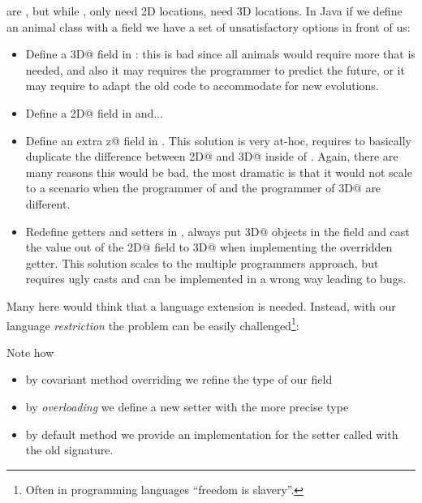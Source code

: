 \Q@Bird@s are \Q@Animal@s, 
but while \Q@Animal@s, only need 2D locations,
\Q@Bird@s need  3D locations.
In Java if we define an animal class with a field we have a set of unsatisfactory options in front of us:
\begin{itemize}
\item Define a \Q@Point3D@ field in \Q@Animal@:
this is bad since all animals would require more that is needed, and also it may requires the programmer to predict the future, or it may require to adapt the old code to accommodate for new evolutions.
\item Define a \Q@Point2D@ field in \Q@Animal@ and...
\item Define an extra \Q@int z@ field in \Q@Bird@.
This solution is very at-hoc, requires to basically duplicate the difference between \Q@Point2D@ and \Q@Point3D@ inside of \mbox{\Q@Bird@}.
Again, there are many reasons this would be bad, the most dramatic is that it would not scale to a scenario when the programmer of \Q@Bird@ and the programmer of \Q@Point3D@ are different.
\item Redefine getters and setters in \Q@Bird@, always put \Q@Point3D@ objects in the field and cast
the value out of the \Q@Point2D@ field to \Q@Point3D@ when implementing the overridden getter.
This solution scales to the multiple programmers approach, but requires ugly casts and can be implemented in a wrong way leading to bugs.
\end{itemize}

Many here would think that a language extension is needed.
Instead, with our language \emph{restriction} the problem can be easily challenged\footnote{Often in programming languages ``freedom is slavery''.}:



Note how
\begin{itemize}
\item by covariant method overriding we refine the type of our field
\item by \emph{overloading} we define a new setter with the more precise type
\item by default method we provide an implementation for the setter called with the old signature.
\end{itemize}

